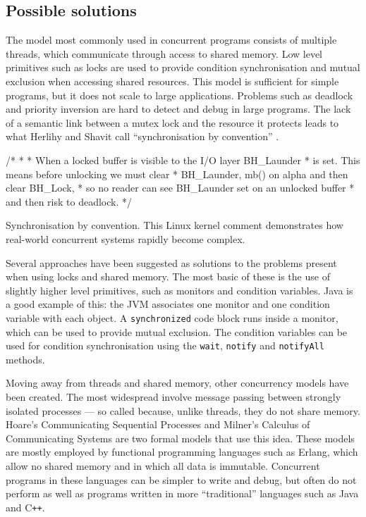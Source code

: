 \documentclass[12pt,a4paper,oneside,openright]{report}
\newcommand{\mycaption}[2]{\caption[#1]{#1 #2}}
\newcommand{\javaKeyword}[1]{\texttt{#1}}
\newcommand{\javaMethod}[1]{\texttt{#1}}
\begin{document}
\subsection{Possible solutions}
\label{sec:possible-solutions}

The model most commonly used in concurrent programs consists of
multiple threads, which communicate through access to shared
memory. Low level primitives such as locks are used to provide
condition synchronisation and mutual exclusion when accessing shared
resources. This model is sufficient for simple programs, but it does
not scale to large applications. Problems such as deadlock and
priority inversion are hard to detect and debug in large programs. The
lack of a semantic link between a mutex lock and the resource it
protects leads to what Herlihy and Shavit call ``synchronisation by
convention'' \cite[Chapter 18]{ArtMultiprocessorProgramming}.

\begin{Listing}[hbtp]
  \begin{JavaCode}
    /* * * When a locked buffer is visible to the I/O layer BH_Launder
    * is set. This means before unlocking we must clear * BH_Launder,
    mb() on alpha and then clear BH_Lock, * so no reader can see
    BH_Launder set on an unlocked buffer * and then risk to deadlock.
    */
  \end{JavaCode}
  \mycaption{Synchronisation by convention.}{This Linux kernel comment
    demonstrates how real-world concurrent systems rapidly become
    complex.}
  \label{lst:syncConv}
\end{Listing}

Several approaches have been suggested as solutions to the problems
present when using locks and shared memory. The most basic of these is
the use of slightly higher level primitives, such as monitors and
condition variables. Java is a good example of this: the JVM
associates one monitor and one condition variable with each object. A
\javaKeyword{synchronized} code block runs inside a monitor, which can
be used to provide mutual exclusion. The condition variables can be
used for condition synchronisation using the \javaMethod{wait},
\javaMethod{notify} and \javaMethod{notifyAll} methods.

Moving away from threads and shared memory, other concurrency models
have been created. The most widespread involve message passing between
strongly isolated processes --- so called because, unlike threads,
they do not share memory. Hoare's Communicating Sequential Processes
\cite{CSP} and Milner's Calculus of Communicating Systems \cite{CCS}
are two formal models that use this idea. These models are mostly
employed by functional programming languages such as Erlang, which
allow no shared memory and in which all data is immutable. Concurrent
programs in these languages can be simpler to write and debug, but
often do not perform as well as programs written in more
``traditional'' languages such as Java and C\texttt{++}.
\end{document}

